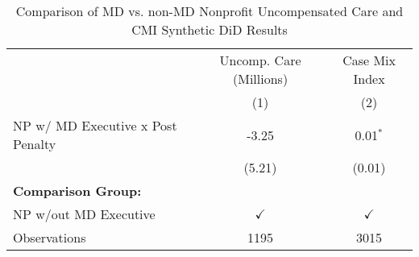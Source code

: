 \begin{table}[ht!]

\caption{\label{tab:MD_noMD_uncompCMI_synth}Comparison of MD vs. non-MD Nonprofit Uncompensated Care and CMI Synthetic DiD Results}
\centering
\begin{tabular}[t]{lcc}
\toprule
\multicolumn{1}{c}{ } & \multicolumn{1}{c}{Uncomp. Care (Millions)} & \multicolumn{1}{c}{Case Mix Index} \\
\cmidrule(l{3pt}r{3pt}){2-2} \cmidrule(l{3pt}r{3pt}){3-3}
 & (1) & (2)\\
\midrule
NP w/ MD Executive x Post Penalty & -3.25 & 0.01$^{*}$\\
 & (5.21) & (0.01)\\
\textbf{Comparison Group:} &  & \\
NP w/out MD Executive & $\checkmark$ & $\checkmark$\\
Observations & 1195 & 3015\\
\bottomrule
\end{tabular}
\end{table}
